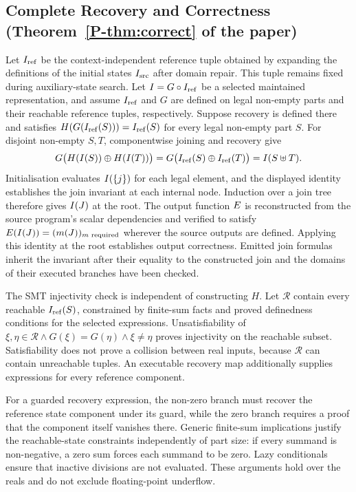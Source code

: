 \documentclass[acmsmall,screen,review,anonymous,nonacm]{acmart}
\newcommand{\pref}[1]{\ref{P-#1} of the paper}
\begin{document}
\subsection{Complete Recovery and Correctness (Theorem~\pref{thm:correct})}
Let $I_{\mathrm{ref}}$ be the context-independent reference tuple obtained by expanding the definitions of the initial states $I_{\mathrm{src}}$ after domain repair.
This tuple remains fixed during auxiliary-state search.
Let $I=G\circ I_{\mathrm{ref}}$ be a selected maintained representation, and assume $I_{\mathrm{ref}}$ and $G$ are defined on legal non-empty parts and their reachable reference tuples, respectively.
Suppose recovery is defined there and satisfies $H(G(I_{\mathrm{ref}}(S)))=I_{\mathrm{ref}}(S)$ for every legal non-empty part $S$.
For disjoint non-empty $S,T$, componentwise joining and recovery give
\[
G\bigl(H(I(S))\oplus H(I(T))\bigr)
=G\bigl(I_{\mathrm{ref}}(S)\oplus I_{\mathrm{ref}}(T)\bigr)
=I(S\uplus T).
\]
Initialisation evaluates $I(\{j\})$ for each legal element, and the displayed identity establishes the join invariant at each internal node.
Induction over a join tree therefore gives $I(J)$ at the root.
The output function $E$ is reconstructed from the source program's scalar dependencies and verified to satisfy $E(I(J))=(m(J))_{m\text{ required}}$ wherever the source outputs are defined.
Applying this identity at the root establishes output correctness.
Emitted join formulas inherit the invariant after their equality to the constructed join and the domains of their executed branches have been checked.

The SMT injectivity check is independent of constructing $H$.
Let $\mathcal R$ contain every reachable $I_{\mathrm{ref}}(S)$, constrained by finite-sum facts and proved definedness conditions for the selected expressions.
Unsatisfiability of $\xi,\eta\in\mathcal R\land G(\xi)=G(\eta)\land\xi\ne\eta$ proves injectivity on the reachable subset.
Satisfiability does not prove a collision between real inputs, because $\mathcal R$ can contain unreachable tuples.
An executable recovery map additionally supplies expressions for every reference component.

For a guarded recovery expression, the non-zero branch must recover the reference state component under its guard, while the zero branch requires a proof that the component itself vanishes there.
Generic finite-sum implications justify the reachable-state constraints independently of part size: if every summand is non-negative, a zero sum forces each summand to be zero.
Lazy conditionals ensure that inactive divisions are not evaluated.
These arguments hold over the reals and do not exclude floating-point underflow.
\end{document}
